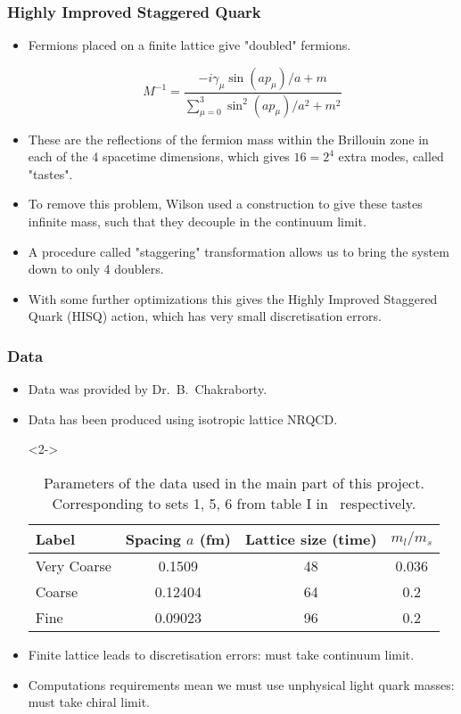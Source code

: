 \documentclass{beamer}
\begin{document}
\begin{frame}
    \frametitle{Highly Improved Staggered Quark}
    \begin{itemize}
        \item Fermions placed on a finite lattice give "doubled" fermions\cite{2016Chakraborty}.
        \item[]
            \begin{equation}
    M^{-1} = \frac{-i\gamma_\mu \sin(ap_\mu)/a+m}{\sum_{\mu=0}^3 \sin^2(ap_\mu)/a^2 + m^2}
    \end{equation}
    \item These are the reflections of the fermion mass within the Brillouin zone in each of the 4 spacetime dimensions, which gives $16=2^4$ extra modes, called "tastes".
    \item To remove this problem, Wilson\cite{1974Wilson} used a construction to give these tastes infinite mass, such that they decouple in the continuum limit. 
    \item A procedure called "staggering" transformation\cite{mason2006high} allows us to bring the system down to only 4 doublers.
    \item With some further optimizations this gives the Highly Improved Staggered Quark (HISQ) action, which has very small discretisation errors.
    \end{itemize}
    \end{frame}

\begin{frame}
\frametitle{Data}
\begin{itemize}
    \item<1-> Data was provided by Dr.\ B.\ Chakraborty.
    \item<1-> Data has been produced using isotropic lattice NRQCD\cite{chakraborty2021improved}.
    \item[]<2-> 
        \begin{table}
            \centering
            \begin{tabular}{l S[table-format=1.5] S[table-format=2.0] S[table-format=1.3]}
Label       & {Spacing $a$ (\si{fm})}   & {Lattice size (time)} & {$m_l / m_s$}\\
\midrule 
Very Coarse & 0.1509                    & 48                    & 0.036\\
Coarse      & 0.12404                   & 64                    & 0.2\\
Fine        & 0.09023                   & 96                    & 0.2\\
            \end{tabular}
            \caption{Parameters of the data used in the main part of this project. Corresponding to sets 1, 5, 6 from table I in~\cite{chakraborty2021improved} respectively.}
        \end{table}
    \item<3-> Finite lattice leads to discretisation errors: must take continuum limit.
    \item<4-> Computations requirements mean we must use unphysical light quark masses: must take chiral limit.
\end{itemize}
\end{frame}
\end{document}
